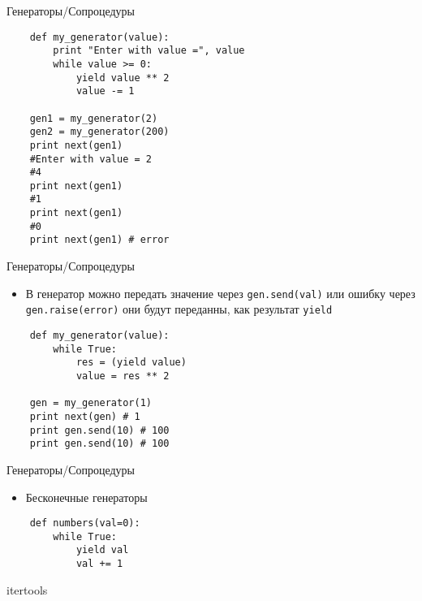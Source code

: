 \documentclass{article}
\begin{document}
\begin{center} Генераторы/Сопроцедуры \end{center}
\vspace{15pt}
\begin{lstlisting}
    def my_generator(value):
        print "Enter with value =", value
        while value >= 0:
            yield value ** 2
            value -= 1

    gen1 = my_generator(2)
    gen2 = my_generator(200)
    print next(gen1) 
    #Enter with value = 2
    #4
    print next(gen1)
    #1
    print next(gen1)
    #0
    print next(gen1) # error
\end{lstlisting}
\newpage

\begin{center} Генераторы/Сопроцедуры \end{center}
\begin{itemize}
    \item В генератор можно передать значение через \lstinline!gen.send(val)!
        или ошибку через \lstinline!gen.raise(error)! они будут переданны, как 
        результат \lstinline!yield!
\end{itemize}
\vspace{15pt}
\begin{lstlisting}
    def my_generator(value):
        while True:
            res = (yield value)
            value = res ** 2

    gen = my_generator(1)
    print next(gen) # 1
    print gen.send(10) # 100
    print gen.send(10) # 100
\end{lstlisting}
\newpage

\begin{center} Генераторы/Сопроцедуры \end{center}
\begin{itemize}
    \item Бесконечные генераторы
\end{itemize}
\vspace{15pt}
\begin{lstlisting}
    def numbers(val=0):
        while True:
            yield val
            val += 1
\end{lstlisting}
\newpage

\begin{center} itertools \end{center}
\newpage
\end{document}
